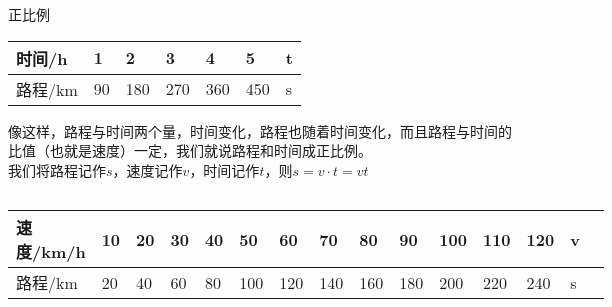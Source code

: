 \documentclass[aspectratio=169]{ctexbeamer} %
\begin{document}
\begin{frame}[t]{正比例}
\begin{center}
\begin{tabular}{| l | l | l | l | l | l | l |}
    \hline
    时间/h & 1 & 2 & 3 & 4 & 5 & t \\
    \hline
    路程/km & 90 & 180 & 270 & 360 & 450 & s \\
    \hline
\end{tabular} 
\end{center}
像这样，路程与时间两个量，时间变化，路程也随着时间变化，而且路程与时间的比值（也就是速度）一定，我们就说路程和时间成\alert{正比例}。\\
我们将路程记作$s$，速度记作$v$，时间记作$t$，则$s = v \cdot t = vt$
\begin{columns}


\begin{center}
\begin{tabular}{| l | l | l | l | l | l | l | l | l | l | l | l | l | l | l |}
    \hline
    速度/km/h & 10 & 20 & 30 & 40 & 50 & 60 & 70 & 80 & 90 & 100 & 110 & 120 & v \\
    \hline
    路程/km & 20  & 40 & 60 & 80 & 100 & 120 & 140 & 160 & 180 & 200 & 220 & 240 & s \\
    \hline
\end{tabular} 
\end{center}

\end{columns}
\end{frame}
\end{document}
